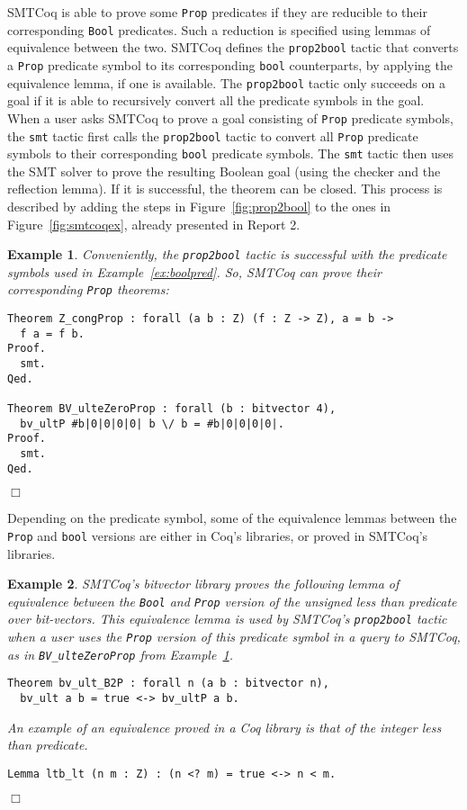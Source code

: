 \documentclass[11pt]{article}
\newtheorem{example}{Example}[section]
\begin{document}
	SMTCoq is 
	able to prove some
	\texttt{Prop} predicates if they 
	are reducible to their
	corresponding 
	\texttt{Bool} predicates. Such a 
	reduction is specified using 
	lemmas of equivalence between 
	the two. SMTCoq
	defines the \texttt{prop2bool} 
	tactic that converts a 
	\texttt{Prop} predicate symbol
	to its corresponding \texttt{bool}
	counterparts, by applying the 
	equivalence lemma, if one is available. 
	The \texttt{prop2bool}
	tactic only succeeds on a goal if 
	it is able to recursively convert all 
	the predicate symbols in the goal. 
	When a user asks 
	SMTCoq to prove a goal consisting 
	of \texttt{Prop} predicate symbols, the 
	\texttt{smt} tactic first calls the 
	\texttt{prop2bool} tactic to 
	convert all \texttt{Prop} predicate
	symbols	to their corresponding 
	\texttt{bool} predicate symbols. The 
	\texttt{smt} tactic
	then uses the SMT solver to 
	prove the resulting Boolean goal 
	(using the 
	checker and the reflection lemma). 
	If it is successful, the 
	theorem can be closed. This process
	is described by adding the steps in 
	Figure~\ref{fig:prop2bool} to the 
	ones in Figure~\ref{fig:smtcoqex},
	already presented in Report 2.
	
	\begin{example}
		\label{ex:proppred}
		\em Conveniently, the 
		\texttt{prop2bool} tactic 
		is successful with the predicate 
		symbols used in Example~\ref{ex:boolpred}.
		So, SMTCoq can prove their 
		corresponding \texttt{Prop}
		theorems:
		\begin{verbatim}
Theorem Z_congProp : forall (a b : Z) (f : Z -> Z), a = b -> 
  f a = f b.
Proof.
  smt.
Qed.
	
Theorem BV_ulteZeroProp : forall (b : bitvector 4), 
  bv_ultP #b|0|0|0|0| b \/ b = #b|0|0|0|0|.
Proof.
  smt.
Qed.
		\end{verbatim}
		\hfill$\Box$
	\end{example}
	
	Depending on the predicate symbol,
	some of the equivalence lemmas 
	between the \texttt{Prop} and 
	\texttt{bool} versions are 
	either in Coq's libraries, or
	proved in SMTCoq's libraries.
	
	\begin{example}
		\em SMTCoq's bitvector library 
		proves the following lemma of 
		equivalence between the 
		\texttt{Bool} and \texttt{Prop} 
		version of the unsigned less than 
		predicate over bit-vectors.
		This equivalence lemma is used
		by SMTCoq's \texttt{prop2bool} 
		tactic when 
		a user uses the \texttt{Prop}
		version of this predicate symbol in 
		a query to SMTCoq, as in 
		\texttt{BV\_ulteZeroProp} from
		Example~\ref{ex:proppred}.
\begin{verbatim}
Theorem bv_ult_B2P : forall n (a b : bitvector n), 
  bv_ult a b = true <-> bv_ultP a b.
\end{verbatim}
		
		An example of an equivalence 
		proved in a Coq library is
		that of the integer less than 
		predicate.
\begin{verbatim}
Lemma ltb_lt (n m : Z) : (n <? m) = true <-> n < m.
\end{verbatim}
	\hfill $\Box$
	\end{example}
	


\end{document}
